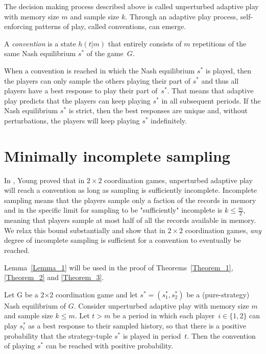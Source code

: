 \bigskip

The decision making process described above is called unperturbed adaptive play with memory size $m$ and sample size $k$. Through an adaptive play process, self-enforcing patterns of play, called conventions, can emerge.


\begin{definition}
A {\emph{convention}} is a state $h(t|m)$ that entirely consists of $m$ repetitions of the same Nash equilibrium $s^*$ of the game~$G$.
\end{definition}

When a convention is reached in which the Nash equilibrium $s^*$ is played, then the players can only sample the others playing their part of $s^*$ and thus all players have a best response to play their part of~$s^*$. That means that adaptive play predicts that the players can keep playing $s^*$ in all subsequent periods. If the Nash equilibrium $s^*$ is strict, then the best responses are unique and, without perturbations, the players will keep playing $s^*$ indefinitely. 

\section{Minimally incomplete sampling} 



In \cite{Young1998}, Young proved that in $2\times 2$ coordination games, unperturbed adaptive play will reach a convention as long as sampling is sufficiently incomplete. Incomplete sampling means that the players sample only a faction of the records in memory and in \cite{Young1998} the specific limit for sampling to be "sufficiently" incomplete is $k \leq \frac{m}{2}$, meaning that players sample at most half of all the records available in memory. 
We relax this bound substantially and show that in $2\times 2$ coordination games, {\emph {any} }degree of incomplete sampling is sufficient for a convention to eventually be reached.





Lemma~\ref{Lemma_1} will be used in the proof of Theorems~\ref{Theorem_1}, \ref{Theorem_2} and \ref{Theorem_3}.

\vskip12pt




\begin{lemma}\label{Lemma_1} Let G be a 2$\times$2 coordination game and let $s^* = (s^*_1, s^*_2)$ be a (pure-strategy) Nash equilibrium of $G$. Consider unperturbed adaptive play with memory size $m$ and sample size $k\leq m$. Let $t > m$ be a period in which each player~$i\in\{1,2\}$ can play $s^*_i$ as a best response to their sampled history, so that there is a positive probability that the strategy-tuple $s^*$ is played in period~$t$. Then the convention of playing $s^*$ can be reached with positive probability.
\end{lemma}



